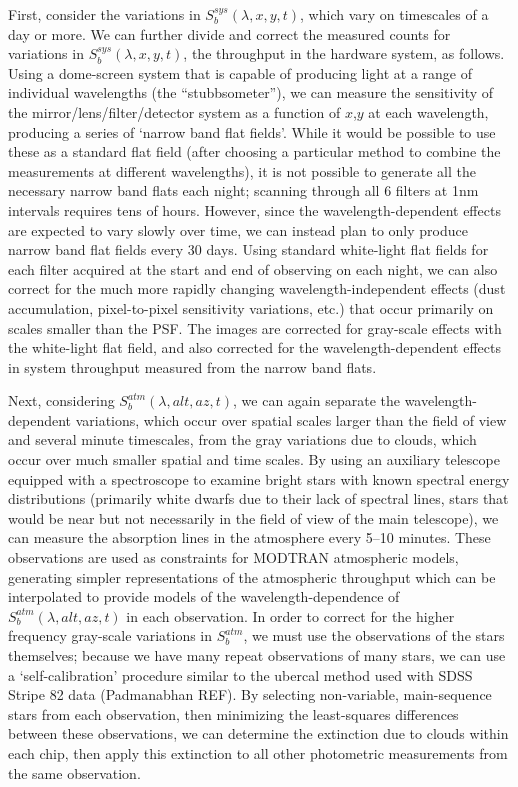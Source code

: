 \documentclass[12pt,preprint]{aastex}
\begin{document}
First, consider the variations in $S_b^{sys}(\lambda,x,y,t)$, which
vary on timescales of a day or more.  We can further divide and
correct the measured counts for variations in
$S_b^{sys}(\lambda,x,y,t)$, the throughput in the hardware system, as
follows. Using a dome-screen system that is capable of producing light
at a range of individual wavelengths (the ``stubbsometer''), we can
measure the sensitivity of the mirror/lens/filter/detector system as a
function of $x$,$y$ at each wavelength, producing a series of `narrow
band flat fields'. While it would be possible to use these as a
standard flat field (after choosing a particular method to combine the
measurements at different wavelengths), it is not possible to generate
all the necessary narrow band flats each night; scanning through all 6
filters at 1nm intervals requires tens of hours. However, since the
wavelength-dependent effects are expected to vary slowly over time, we
can instead plan to only produce narrow band flat fields every 30
days. Using standard white-light flat fields for each filter acquired
at the start and end of observing on each night, we can also correct
for the much more rapidly changing wavelength-independent effects
(dust accumulation, pixel-to-pixel sensitivity variations, etc.) that
occur primarily on scales smaller than the PSF. The images are
corrected for gray-scale effects with the white-light flat field, and
also corrected for the wavelength-dependent effects in system
throughput measured from the narrow band flats.

Next, considering $S_b^{atm}(\lambda,alt,az,t)$, we can again
separate the wavelength-dependent variations, which occur over
spatial scales larger than the field of view and several minute timescales, from the gray
variations due to clouds, which occur over much smaller spatial and
time scales. By using an auxiliary telescope equipped with a
spectroscope to examine bright stars with known spectral energy
distributions (primarily white dwarfs due to their lack of spectral
lines, stars that would be near but not necessarily in the field of
view of the main telescope), we can measure the absorption lines in
the atmosphere every 5--10 minutes. These observations are used as
constraints for MODTRAN atmospheric models, generating simpler
representations of the atmospheric throughput which can be
interpolated to provide models of the wavelength-dependence of
$S_b^{atm}(\lambda,alt,az,t)$ in each observation. In order to correct
for the higher frequency gray-scale variations in $S_b^{atm}$, we must
use the observations of the stars themselves; because we have many repeat
observations of many stars, we can use a `self-calibration' procedure
similar to the ubercal method used with SDSS Stripe 82 data
(Padmanabhan REF). By selecting non-variable, main-sequence stars
from each observation, then minimizing the least-squares differences
between these observations, we can determine the extinction due to
clouds within each chip, then apply this extinction to all other
photometric measurements from the same observation. 
\end{document}
